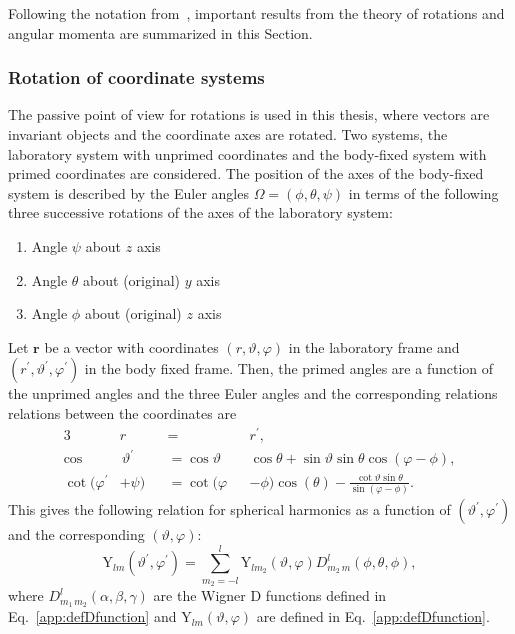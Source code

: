 Following the notation from~\cite{varshalovich1988}, important results from the theory of rotations and angular momenta are summarized in this Section.
\subsubsection*{Rotation of coordinate systems}
The passive point of view for rotations is used in this thesis, where vectors are invariant objects and the coordinate axes are rotated. Two systems, the laboratory system with unprimed coordinates and the body-fixed system with primed coordinates are considered. The position of the axes of the body-fixed system is described by the Euler angles $\Omega=(\phi,\theta,\psi)$ in terms of the following three successive rotations of the axes of the laboratory system:
\begin{enumerate}
\item Angle $\psi$ about $z$ axis
\item Angle $\theta$ about (original) $y$ axis
\item Angle $\phi$ about (original) $z$ axis
\end{enumerate}
Let $\mathbf{r}$ be a vector with coordinates $(r,\vartheta,\varphi)$ in the laboratory frame and $(r^\prime,\vartheta^\prime,\varphi^\prime)$ in the body fixed frame. Then, the primed angles are a function of the unprimed angles and the three Euler angles and the corresponding relations relations between the coordinates are
\begin{alignat}{3}
& r &&= &&r^\prime,\\
\cos&\,\vartheta^\prime &&= \cos\vartheta && \cos\theta + \sin\vartheta\sin\theta\cos(\varphi-\phi),\\
\cot (\varphi^\prime &+ \psi) &&= \cot (\varphi &&- \phi)\cos(\theta)-\frac{\cot\vartheta \sin\theta}{\sin(\varphi-\phi)}.
\end{alignat}
This gives the following relation for spherical harmonics as a function of $(\vartheta^\prime,\varphi^\prime)$ and the corresponding $(\vartheta,\varphi)$:
\begin{equation}
\label{eq:rot_sphHarm}
\text{Y}_{lm}(\vartheta^\prime,\varphi^\prime)=\sum_{m_2=-l}^l \text{Y}_{lm_2}(\vartheta,\varphi) D^l_{m_2\,m}(\phi,\theta,\phi),
\end{equation}
where $D^l_{m_1\,m_2}(\alpha,\beta,\gamma)$ are the Wigner D functions defined in Eq.~\eqref{app:defDfunction} and $\text{Y}_{lm}(\vartheta,\varphi)$ are defined in Eq.~\eqref{app:defDfunction}.

